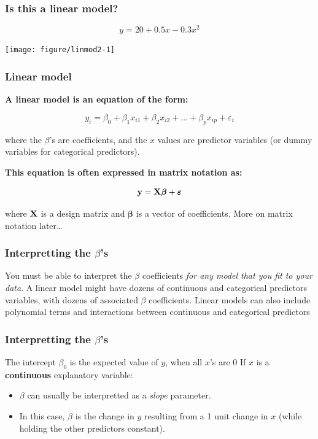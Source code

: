 \documentclass[color=usenames,dvipsnames]{beamer}\usepackage[]{graphicx}\usepackage[]{color}
\begin{document}
\begin{frame}[fragile]
  \frametitle{Is this a linear model?}
\[
y = 20 + 0.5 x - 0.3 x^2
\]

\begin{center}
  \texttt{[image: figure/linmod2-1]}
\end{center}
\end{frame}





\begin{frame}
  \frametitle{Linear model}
{\bf A linear model is an equation of the form:}

\[
y_i = \beta_0 + \beta_1 x_{i1} + \beta_2 x_{i2} + \ldots + \beta_p x_{ip} + \varepsilon_i
\]

where the $\beta$'s are coefficients, and the $x$ values are predictor
variables (or dummy variables for categorical predictors).
\pause

\vspace{0.5cm}

{\bf This equation is often expressed in matrix notation as:}

\[
{\bf y} = {\bf X} {\bm{\beta}} + {\bm \varepsilon}
\]

where $\bf X$ is a \alert{design matrix} and $\bm{\beta}$ is a
vector of coefficients. \pause More on matrix notation later\dots
\end{frame}






\begin{frame}
  \frametitle{Interpretting the $\beta$'s}
You must be able to interpret the $\beta$
coefficients {\it for any model that you fit to your data}.
\pause
\vfill
A linear model might have dozens of continuous and categorical
predictors variables, with dozens of associated $\beta$ coefficients.
\pause
\vfill
Linear models can also include polynomial terms and interactions
between continuous and categorical predictors
\end{frame}


\begin{frame}
  \frametitle{Interpretting the $\beta$'s}%
  The intercept $\beta_0$ is the expected value of $y$, when all $x$'s are 0
  \pause
  \vfill
  If $x$ is a {\bf continuous} explanatory variable: %
  \begin{itemize}
    \item $\beta$ can usually be interpretted as a \textit{slope}
      parameter.
    \item In this case, $\beta$ is the
      change in $y$ resulting from a 1 unit change in $x$ (while
      holding the other predictors constant).
  \end{itemize}
\end{frame}
\end{document}
